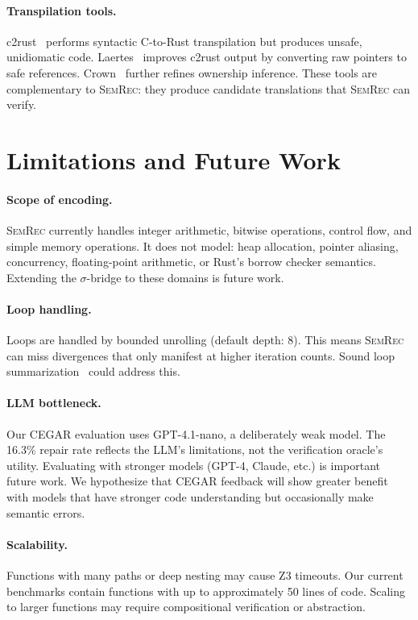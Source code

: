 \documentclass[10pt,letterpaper]{article}
\begin{document}
\paragraph{Transpilation tools.}
c2rust~\cite{c2rust} performs syntactic C-to-Rust transpilation but produces
unsafe, unidiomatic code. Laertes~\cite{emre2021laertes} improves c2rust output
by converting raw pointers to safe references. Crown~\cite{zhang2023crown}
further refines ownership inference. These tools are complementary to
\textsc{SemRec}: they produce candidate translations that \textsc{SemRec}
can verify.

\section{Limitations and Future Work}
\label{sec:limitations}

\paragraph{Scope of encoding.}
\textsc{SemRec} currently handles integer arithmetic, bitwise operations,
control flow, and simple memory operations. It does not model: heap allocation,
pointer aliasing, concurrency, floating-point arithmetic, or Rust's borrow
checker semantics. Extending the $\sigma$-bridge to these domains is future work.

\paragraph{Loop handling.}
Loops are handled by bounded unrolling (default depth: 8). This means
\textsc{SemRec} can miss divergences that only manifest at higher iteration
counts. Sound loop summarization~\cite{kroening2011loop} could address this.

\paragraph{LLM bottleneck.}
Our CEGAR evaluation uses GPT-4.1-nano, a deliberately weak model. The 16.3\%
repair rate reflects the LLM's limitations, not the verification oracle's utility.
Evaluating with stronger models (GPT-4, Claude, etc.) is important future work.
We hypothesize that CEGAR feedback will show greater benefit with models that have
stronger code understanding but occasionally make semantic errors.

\paragraph{Scalability.}
Functions with many paths or deep nesting may cause Z3 timeouts. Our current
benchmarks contain functions with up to approximately 50 lines of code. Scaling to
larger functions may require compositional verification or abstraction.
\end{document}
